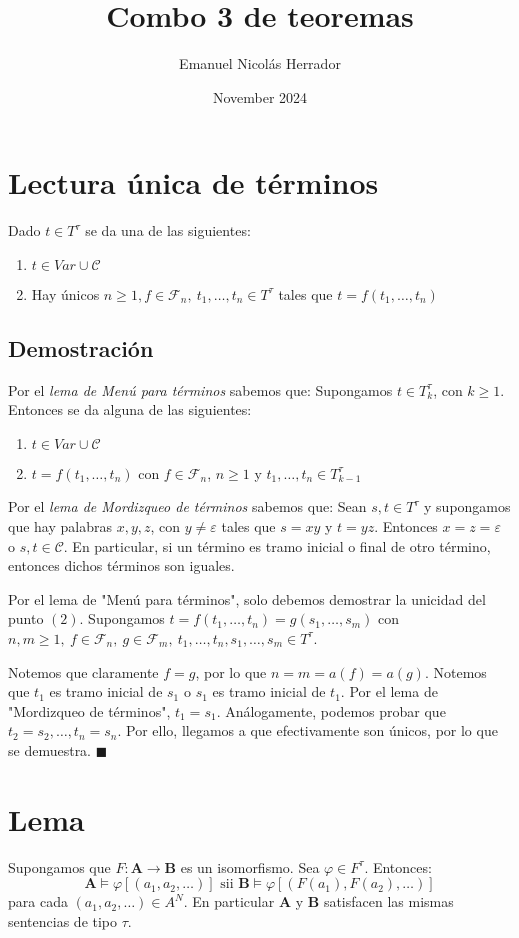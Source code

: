 \documentclass{article}
\title{Combo 3 de teoremas}
\author{Emanuel Nicolás Herrador}
\date{November 2024}
\begin{document}
\maketitle

\section*{Lectura única de términos}
Dado $t\in T^\tau$ se da una de las siguientes:
\begin{enumerate}
  \item $t\in Var\cup\mathcal{C}$
  \item Hay únicos $n\geq 1,f\in\mathcal{F}_n,\ t_1,\dots,t_n\in T^\tau$ tales que $t=f(t_1,\dots,t_n)$
\end{enumerate}
\subsection*{Demostración}
Por el \textit{lema de Menú para términos} sabemos que: Supongamos $t\in T^\tau_k$, con $k\geq 1$. Entonces se da alguna de las siguientes:
\begin{enumerate}
  \item $t\in Var\cup\mathcal{C}$
  \item $t=f(t_1,\dots,t_n)$ con $f\in\mathcal{F}_n$, $n\geq 1$ y $t_1,\dots,t_n\in T^\tau_{k-1}$
\end{enumerate}

Por el \textit{lema de Mordizqueo de términos} sabemos que: Sean $s,t\in T^\tau$ y supongamos que hay palabras $x,y,z$, con $y\neq\varepsilon$ tales que $s=xy$ y $t=yz$. Entonces $x=z=\varepsilon$ o $s,t\in\mathcal{C}$. En particular, si un término es tramo inicial o final de otro término, entonces dichos términos son iguales.

\vspace{0.6cm}
Por el lema de "Menú para términos", solo debemos demostrar la unicidad del punto $(2)$. Supongamos $t=f(t_1,\dots,t_n)=g(s_1,\dots,s_m)$ con $n,m\geq 1,\ f\in\mathcal{F}_n,\ g\in\mathcal{F}_m,\ t_1,\dots,t_n,s_1,\dots,s_m\in T^\tau$.

Notemos que claramente $f=g$, por lo que $n=m=a(f)=a(g)$. Notemos que $t_1$ es tramo inicial de $s_1$ o $s_1$ es tramo inicial de $t_1$. Por el lema de "Mordizqueo de términos", $t_1=s_1$. Análogamente, podemos probar que $t_2=s_2,\dots,t_n=s_n$. Por ello, llegamos a que efectivamente son únicos, por lo que se demuestra. $\blacksquare$

\section*{Lema}
Supongamos que $F:\mathbf{A}\to\mathbf{B}$ es un isomorfismo. Sea $\varphi\in F^\tau$. Entonces:
\begin{equation*}
  \mathbf{A}\vDash\varphi[(a_1,a_2,\dots)]\text{ sii }\mathbf{B}\vDash\varphi[(F(a_1),F(a_2),\dots)]
\end{equation*}
para cada $(a_1,a_2,\dots)\in A^N$. En particular $\mathbf{A}$ y $\mathbf{B}$ satisfacen las mismas sentencias de tipo $\tau$.
\end{document}
